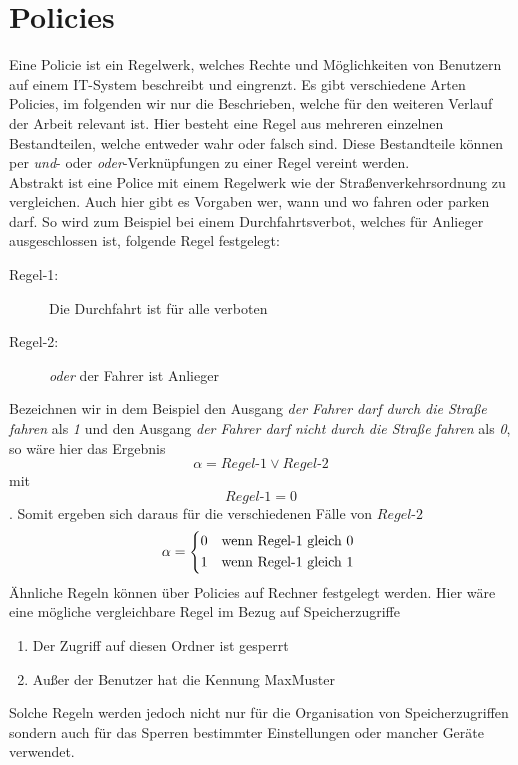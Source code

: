 \chapter{Policies} \label{Policies}
Eine Policie ist ein Regelwerk, welches Rechte und Möglichkeiten von Benutzern auf einem IT-System beschreibt und eingrenzt. Es gibt verschiedene Arten Policies, im folgenden wir nur die Beschrieben, welche für den weiteren Verlauf der Arbeit relevant ist. Hier besteht eine Regel aus mehreren einzelnen Bestandteilen, welche entweder wahr oder falsch sind. Diese Bestandteile können per \textit{und}- oder \textit{oder}-Verknüpfungen zu einer Regel vereint werden.\\
Abstrakt ist eine Police mit einem Regelwerk wie der Straßenverkehrsordnung zu vergleichen. Auch hier gibt es Vorgaben wer, wann und wo fahren oder parken darf. So wird zum Beispiel bei einem Durchfahrtsverbot, welches für Anlieger ausgeschlossen ist, folgende Regel festgelegt:
\begin{description}
	\item[Regel-1: ] Die Durchfahrt ist für alle verboten
	\item[Regel-2: ] \textit{oder} der Fahrer ist Anlieger
\end{description}
Bezeichnen wir in dem Beispiel den Ausgang \textit{der Fahrer darf durch die Straße fahren} als \textit{1} und den Ausgang \textit{der Fahrer darf nicht durch die Straße fahren} als \textit{0}, so wäre hier das Ergebnis
\begin{equation*}
	\alpha = Regel\text{-}1 \vee Regel\text{-}2
\end{equation*} mit 
\begin{equation*}
	Regel\text{-}1=0
\end{equation*}. Somit ergeben sich daraus für die verschiedenen Fälle von $Regel$-$2$
\[
	\alpha = 
		\begin{dcases*}
			0 & wenn Regel\text{-}1 gleich 0\\
			1 & wenn Regel\text{-}1 gleich 1
		\end{dcases*}
\]
Ähnliche Regeln können über Policies auf Rechner festgelegt werden. Hier wäre eine mögliche vergleichbare Regel im Bezug auf Speicherzugriffe
\begin{enumerate}
	\item Der Zugriff auf diesen Ordner ist gesperrt
	\item Außer der Benutzer hat die Kennung MaxMuster
\end{enumerate}
Solche Regeln werden jedoch nicht nur für die Organisation von Speicherzugriffen sondern auch für das Sperren bestimmter Einstellungen oder mancher Geräte verwendet.